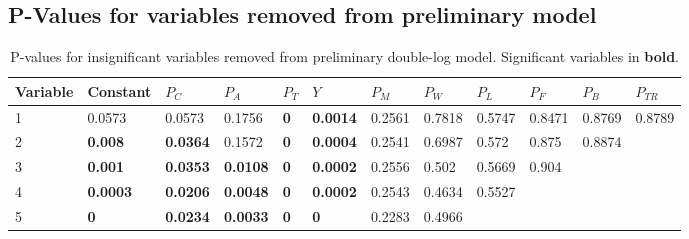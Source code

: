 \documentclass[12pt]{article}
\begin{document}
\begin{landscape}
\subsection{P-Values for variables removed from preliminary model} %
\label{sub:pval}
\begin{table}[!htb]\caption{\label{tb:varremoval} P-values for insignificant variables removed from preliminary double-log model. Significant variables in \textbf{bold}.}
\begin{tabularx}{\linewidth}{XXXXXXXXXXXX}
\textbf{Variable} & \textbf{Constant} & \(P_C\) & \(P_A\) & \(P_T\) & \(Y\) & \(P_M\) &\(P_W\) & \(P_L\)                     & \(P_F\)                     & \(P_B\)                     & \(P_{TR}\)                      \\\hline\hline
1                            & 0.0573                       & 0.0573                     & 0.1756                       & \textbf{0}                         & \textbf{0.0014}                      & 0.2561                     & 0.7818                     & 0.5747 & 0.8471 &0.8769 &0.8789  \\
2                            & \textbf{0.008}                        & \textbf{0.0364}                     & 0.1572                       & \textbf{0}                         & \textbf{0.0004}                      & 0.2541                     & 0.6987                     & 0.572  & 0.875  & 0.8874 &                             \\
3                            & \textbf{0.001}                        & \textbf{0.0353}                     & \textbf{0.0108}                       & \textbf{0}                         & \textbf{0.0002}                      & 0.2556                     & 0.502                      & 0.5669 & 0.904  &                            &                             \\
4                            & \textbf{0.0003}                       & \textbf{0.0206}                     & \textbf{0.0048}                       & \textbf{0}                         & \textbf{0.0002}                      & 0.2543                     & 0.4634                     & 0.5527 &                            &                            &                             \\
5                            & \textbf{0}                            & \textbf{0.0234}                     & \textbf{0.0033}                       & \textbf{0}                         & \textbf{0}                           & 0.2283                     & 0.4966                     &                            &                            &                            &                             \\

\end{tabularx}
\end{table}
\end{landscape}
\end{document}
